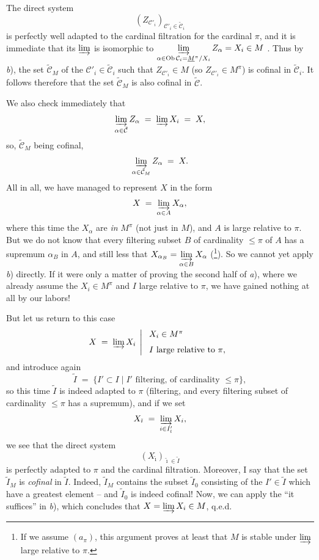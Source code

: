 \documentclass[11pt]{article}
\newcommand{\printedpage}[1]{\marginpar{\footnotesize p.~#1}}
\newcommand{\msp}[1]{\marginpar{\footnotesize [#1]}}
\begin{document}
The direct system
\[ (Z_{\mathcal{C}'_i})_{\mathcal{C}'_i\in\tilde{\mathcal{C}}_i} \]
is perfectly well adapted to the cardinal filtration for the cardinal $\pi$, and it is immediate that its $\varinjlim$ is isomorphic to $\varinjlim\limits_{\alpha\in\operatorname{Ob}\mathcal{C}_i=\underline{M}^\pi/X_i} Z_\alpha = X_i\in M$ . Thus by \textit{b}), the set $\tilde{\mathcal{C}}_M$ of the $\mathcal{C}'_i\in\tilde{\mathcal{C}}_i$ such that $Z_{\mathcal{C}'_i}\in M$ (so $Z_{\mathcal{C}'_i}\in M^\pi$) is cofinal in $\tilde{\mathcal{C}}_i$. It follows therefore that the set $\tilde{\mathcal{C}}_M$ is also cofinal in $\tilde{\mathcal{C}}$.

\printedpage{51}

\msp{page 95}We also check immediately that
\[ \varinjlim_{\alpha\in\tilde{\mathcal{C}}} Z_\alpha \;=\; \varinjlim X_i \;=\; X, \]
so, $\tilde{\mathcal{C}}_M$ being cofinal,
\[ \varinjlim_{\alpha\in\tilde{\mathcal{C}}_M} Z_\alpha \;=\; X. \]
All in all, we have managed to represent $X$ in the form
\[ X \;=\; \varinjlim_{\alpha\in A} X_\alpha, \]
where this time the $X_\alpha$ are \textit{in} $M^\pi$ (not just in $M$), and $A$ is large relative to $\pi$. But we do not know that every filtering subset $B$ of cardinality $\le\pi$ of $A$ has a supremum $\alpha_B$ in $A$, and still less that $X_{\alpha_B} = \varinjlim\limits_{\alpha\in B} X_\alpha$ (\footnote[45]{If we assume $(a_\pi)$, this argument proves at least that $M$ is stable under $\varinjlim$ large relative to $\pi$.}). So we cannot yet apply \textit{b}) directly. If it were only a matter of proving the second half of \textit{a}), where we already assume the $X_i\in M^\pi$ and $I$ large relative to $\pi$, we have gained nothing at all by our labors!

\msp{page 96}But let us return to this case
\[ X \;=\; \varinjlim X_i \;\left|\; \begin{array}{l} X_i\in M^\pi \\[1.5ex] I \text{ large relative to } \pi, \end{array}\right. \]
and introduce again
\[ \tilde{I} \;=\; \{I'\subset I \mid I' \text{ filtering, of cardinality } \le\pi\}, \]
so this time $\tilde{I}$ is indeed adapted to $\pi$ (filtering, and every filtering subset of cardinality $\le\pi$ has a supremum), and if we set
\[ X_{\tilde{\imath}} \;=\; \varinjlim_{i\in I'_{\tilde{\imath}}} X_i, \]
we see that the direct system
\[ (X_{\tilde{\imath}})_{\tilde{\imath}\in\tilde{I}} \]
is perfectly adapted to $\pi$ and the cardinal filtration. Moreover, I say that the set $\tilde{I}_M$ is \textit{cofinal} in $\tilde{I}$. Indeed, $\tilde{I}_M$ contains the subset $\tilde{I}_0$ consisting of the $I'\in\tilde{I}$ which have a greatest element -- and $\tilde{I}_0$ is indeed cofinal! Now, we can apply
\printedpage{52}
\msp{page 97}the ``it suffices'' in \textit{b}), which concludes that $X = \varinjlim X_i\in M$, q.e.d. %
\end{document}
